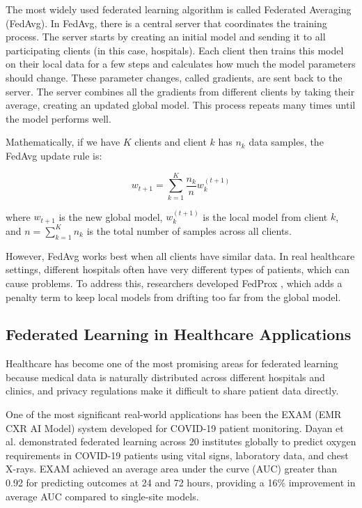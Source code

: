 \documentclass[3p,times,procedia]{elsarticle}
\begin{document}
The most widely used federated learning algorithm is called Federated Averaging (FedAvg). In FedAvg, there is a central server that coordinates the training process. The server starts by creating an initial model and sending it to all participating clients (in this case, hospitals). Each client then trains this model on their local data for a few steps and calculates how much the model parameters should change. These parameter changes, called gradients, are sent back to the server. The server combines all the gradients from different clients by taking their average, creating an updated global model. This process repeats many times until the model performs well.

Mathematically, if we have $K$ clients and client $k$ has $n_k$ data samples, the FedAvg update rule is:

$$w_{t+1} = \sum_{k=1}^{K} \frac{n_k}{n} w_k^{(t+1)}$$

where $w_{t+1}$ is the new global model, $w_k^{(t+1)}$ is the local model from client $k$, and $n = \sum_{k=1}^{K} n_k$ is the total number of samples across all clients.

However, FedAvg works best when all clients have similar data. In real healthcare settings, different hospitals often have very different types of patients, which can cause problems. To address this, researchers developed FedProx \cite{Li2020}, which adds a penalty term to keep local models from drifting too far from the global model.

\subsection{Federated Learning in Healthcare Applications}

Healthcare has become one of the most promising areas for federated learning because medical data is naturally distributed across different hospitals and clinics, and privacy regulations make it difficult to share patient data directly.

One of the most significant real-world applications has been the EXAM (EMR CXR AI Model) system developed for COVID-19 patient monitoring. Dayan et al. \cite{Dayan2021} demonstrated federated learning across 20 institutes globally to predict oxygen requirements in COVID-19 patients using vital signs, laboratory data, and chest X-rays. EXAM achieved an average area under the curve (AUC) greater than 0.92 for predicting outcomes at 24 and 72 hours, providing a 16\% improvement in average AUC compared to single-site models.
\end{document}
